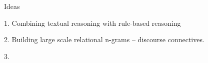 

Ideas

1. Combining textual reasoning with rule-based reasoning

2. Building large scale relational n-grams -- discourse connectives.

3.


